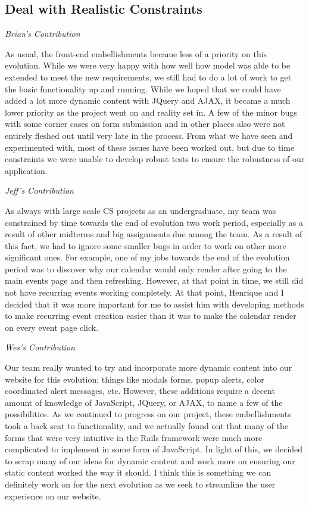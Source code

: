 \documentclass[11pt]{article}
\begin{document}
\subsection{Deal with Realistic Constraints}

\textit{Brian's Contribution}

As usual, the front-end embellishments became less of a priority on this evolution. While we were very happy with how well how model was able to be extended to meet the new requirements, we still had to do a lot of work to get the basic functionality up and running. While we hoped that we could have added a lot more dynamic content with JQuery and AJAX, it became a much lower priority as the project went on and reality set in. A few of the minor bugs with some corner cases on form submission and in other places also were not entirely fleshed out until very late in the process. From what we have seen and experimented with, most of these issues have been worked out, but due to time constraints we were unable to develop robust tests to ensure the robustness of our application.

\textit{Jeff's Contribution}

As always with large scale CS projects as an undergraduate, my team was constrained by time towards the end of evolution two work period, especially as a result of other midterms and big assignments due among the team.  As a result of this fact, we had to ignore some smaller bugs in order to work on other more significant ones.  For example, one of my jobs towards the end of the evolution period was to discover why our calendar would only render after going to the main events page and then refreshing.  However, at that point in time, we still did not have recurring events working completely.  At that point, Henrique and I decided that it was more important for me to assist him with developing methods to make recurring event creation easier than it was to make the calendar render on every event page click.

\textit{Wes's Contribution}

Our team really wanted to try and incorporate more dynamic content into our website for this evolution; things like modals forms, popup alerts, color coordinated alert messages, etc.  However, these additions require a decent amount of knowledge of JavaScript, JQuery, or AJAX, to name a few of the possibilities.  As we continued to progress on our project, these embellishments took a back seat to functionality, and we actually found out that many of the forms that were very intuitive in the Rails framework were much more complicated to implement in some form of JavaScript.  In light of this, we decided to scrap many of our ideas for dynamic content and work more on ensuring our static content worked the way it should.  I think this is something we can definitely work on for the next evolution as we seek to streamline the user experience on our website. 
\end{document}
